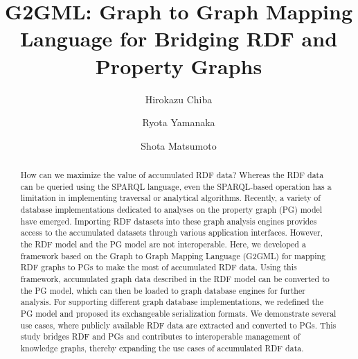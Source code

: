 \documentclass[runningheads]{llncs}
\begin{document}
\newtheorem{defi}[theorem]{Definition}
\newtheorem*{prel}{Preliminaries}

%
\title{G2GML: Graph to Graph Mapping Language for Bridging RDF and Property Graphs} 
%
%
\author{Hirokazu Chiba \and Ryota Yamanaka \and Shota Matsumoto}
%

\setlength\abovecaptionskip{0ex}
%
%
\maketitle
%
\begin{abstract}
How can we maximize the value of accumulated RDF data? Whereas the RDF data can be queried using the SPARQL language, even the SPARQL-based operation has a limitation in implementing traversal or analytical algorithms. Recently, a variety of database implementations dedicated to analyses on the property graph (PG) model have emerged. Importing RDF datasets into these graph analysis engines provides access to the accumulated datasets through various application interfaces. However, the RDF model and the PG model are not interoperable. Here, we developed a framework based on the Graph to Graph Mapping Language (G2GML) for mapping RDF graphs to PGs to make the most of accumulated RDF data. Using this framework, accumulated graph data described in the RDF model can be converted to the PG model, which can then be loaded to graph database engines for further analysis. For supporting different graph database implementations, we redefined the PG model and proposed its exchangeable serialization formats. We demonstrate several use cases, where publicly available RDF data are extracted and converted to PGs. This study bridges RDF and PGs and contributes to interoperable management of knowledge graphs, thereby expanding the use cases of accumulated RDF data.


\end{abstract}
\end{document}
